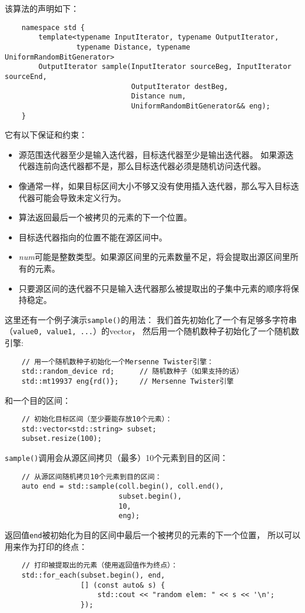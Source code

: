 该算法的声明如下：
\begin{lstlisting}
    namespace std {
        template<typename InputIterator, typename OutputIterator,
                 typename Distance, typename UniformRandomBitGenerator>
        OutputIterator sample(InputIterator sourceBeg, InputIterator sourceEnd,
                              OutputIterator destBeg,
                              Distance num,
                              UniformRandomBitGenerator&& eng);
    }
\end{lstlisting}
它有以下保证和约束：
\begin{itemize}
    \item 源范围迭代器至少是输入迭代器，目标迭代器至少是输出迭代器。
    如果源迭代器连前向迭代器都不是，那么目标迭代器必须是随机访问迭代器。
    \item 像通常一样，如果目标区间大小不够又没有使用插入迭代器，那么写入目标迭代器可能会导致未定义行为。
    \item 算法返回最后一个被拷贝的元素的下一个位置。
    \item 目标迭代器指向的位置不能在源区间中。
    \item \emph{num}可能是整数类型。如果源区间里的元素数量不足，将会提取出源区间里所有的元素。
    \item 只要源区间的迭代器不只是输入迭代器那么被提取出的子集中元素的顺序将保持稳定。
\end{itemize}
这里还有一个例子演示\texttt{sample()}的用法：
我们首先初始化了一个有足够多字符串（\texttt{value0, value1, ...}）的vector，
然后用一个随机数种子初始化了一个随机数引擎:
\begin{lstlisting}
    // 用一个随机数种子初始化一个Mersenne Twister引擎：
    std::random_device rd;      // 随机数种子（如果支持的话）
    std::mt19937 eng{rd()};     // Mersenne Twister引擎
\end{lstlisting}
和一个目的区间：
\begin{lstlisting}
    // 初始化目标区间（至少要能存放10个元素）：
    std::vector<std::string> subset;
    subset.resize(100);
\end{lstlisting}
\texttt{sample()}调用会从源区间拷贝（最多）10个元素到目的区间：
\begin{lstlisting}
    // 从源区间随机拷贝10个元素到目的区间：
    auto end = std::sample(coll.begin(), coll.end(),
                           subset.begin(),
                           10,
                           eng);
\end{lstlisting}
返回值\texttt{end}被初始化为目的区间中最后一个被拷贝的元素的下一个位置，
所以可以用来作为打印的终点：
\begin{lstlisting}
    // 打印被提取出的元素（使用返回值作为终点）：
    std::for_each(subset.begin(), end,
                  [] (const auto& s) {
                      std::cout << "random elem: " << s << '\n';
                  });
\end{lstlisting}

